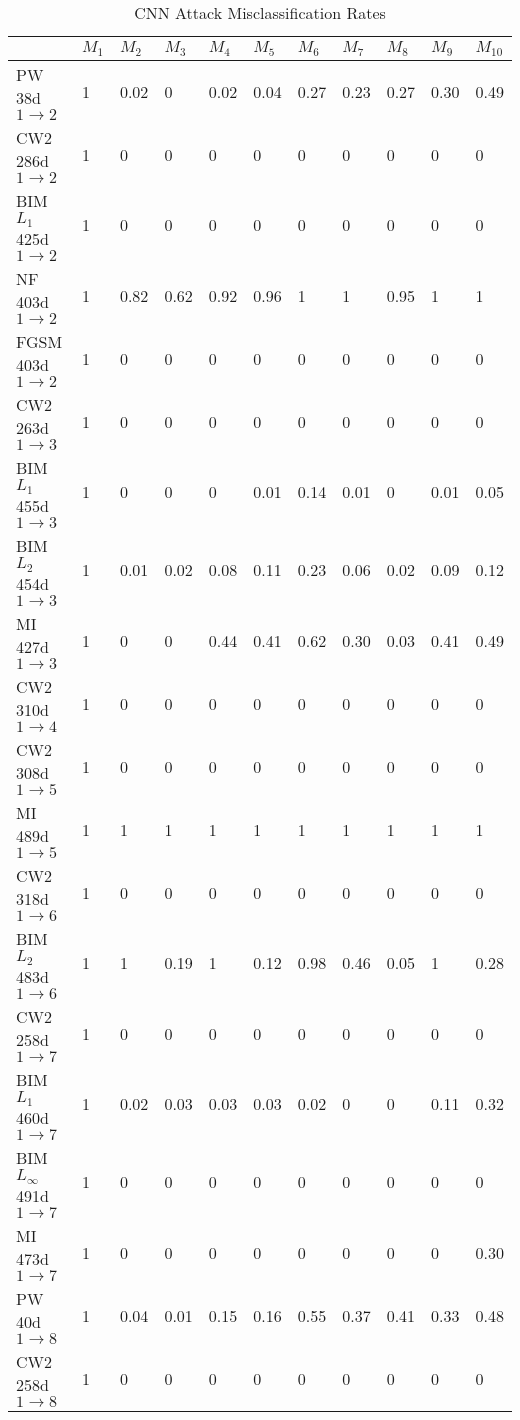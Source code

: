 \documentclass[12pt]{article}
\begin{document}
%
%
\begin{table}[t]
\caption{CNN Attack Misclassification Rates}
\label{tab:attack-misrate-mnist-cnn}
\begin{center}
{\footnotesize  
\begin{tabular}{|l|llllllllll|} \hline
   &$M_1$&$M_2$&$M_3$&$M_4$&$M_5$&$M_6$&$M_7$&$M_8$&$M_9$&$M_{10}$\\\hline
PW 38d $1\to 2$ & 1 & 0.02 & 0 & 0.02 & 0.04 & 0.27 & 0.23 & 0.27 & 0.30 & 0.49 \\   
CW2 286d $1\to 2$& 1 & 0 & 0 & 0 & 0 & 0 & 0 & 0 & 0 & 0 \\
BIM $L_1$ 425d $1\to 2$& 1 & 0 & 0 & 0 & 0 & 0 & 0 & 0 & 0 & 0\\
NF 403d  $1\to 2$& 1 & 0.82 & 0.62 & 0.92 & 0.96 & 1 & 1 & 0.95 & 1 & 1 \\
FGSM 403d $1\to 2$& 1 & 0 & 0 & 0 & 0 & 0 & 0 & 0 & 0 & 0 \\\hline
CW2 263d $1\to 3$&  1 & 0 & 0 & 0 & 0 & 0 & 0 & 0 & 0 & 0 \\  
BIM $L_1$ 455d $1\to 3$& 1 & 0 & 0 & 0 & 0.01 & 0.14 & 0.01 & 0 & 0.01 & 0.05\\
BIM $L_2$ 454d $1\to 3$& 1 & 0.01 & 0.02 & 0.08 & 0.11 & 0.23 & 0.06 & 0.02 & 0.09 & 0.12\\
MI 427d $1\to 3$& 1 & 0 & 0 & 0.44 & 0.41 & 0.62 & 0.30 & 0.03 & 0.41& 0.49 \\\hline
CW2 310d $1\to 4$ & 1 & 0 & 0 & 0 & 0 & 0 & 0 & 0 & 0 & 0\\\hline
CW2 308d $1\to 5$ & 1 & 0 & 0 & 0 & 0 & 0 & 0 & 0 & 0 & 0\\
MI 489d $1\to 5$  & 1 & 1 & 1 & 1 & 1 & 1 & 1 & 1 & 1 & 1 \\\hline
CW2 318d $1\to 6$& 1 & 0 & 0 & 0 & 0 & 0 & 0 & 0 & 0 & 0\\
BIM $L_2$ 483d $1\to 6$& 1 & 1 & 0.19 & 1 & 0.12 & 0.98 & 0.46 & 0.05& 1 & 0.28\\\hline
CW2 258d $1\to 7$& 1 & 0 & 0 & 0 & 0 & 0 & 0 & 0 & 0 & 0\\
BIM $L_1$ 460d $1\to 7$& 1 & 0.02 & 0.03 & 0.03 & 0.03 & 0.02 & 0 & 0 & 0.11 & 0.32 \\
BIM $L_{\infty}$ 491d $1\to 7$& 1 & 0 & 0 & 0 & 0 & 0 & 0 & 0 & 0 & 0\\
MI 473d $1\to 7$ & 1 & 0 & 0 & 0 & 0 & 0 & 0 & 0 & 0 & 0.30 \\\hline
PW 40d $1\to 8$& 1 & 0.04 & 0.01 & 0.15 & 0.16 & 0.55 & 0.37 & 0.41 & 0.33 & 0.48\\
CW2 258d $1\to 8$& 1 & 0 & 0 & 0 & 0 & 0 & 0 & 0 & 0 & 0 \\

\end{tabular}}
\end{center}
\end{table}
\end{document}
